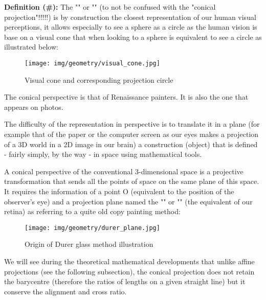	\textbf{Definition (\#\mydef):} The "" or "" (to not be confused with the "conical projection"!!!!!) is by construction the closest representation of our human visual perceptions, it allows especially to see a sphere as a circle as the human vision is base on a visual cone that when looking to a sphere is equivalent to see a circle as illustrated below:
	\begin{figure}[H]
		\centering
		\texttt{[image: img/geometry/visual\_cone.jpg]}
		\caption{Visual cone and corresponding projection circle}
	\end{figure}
	
	\begin{tcolorbox}[title=Remark,colframe=black,arc=10pt]
	The conical perspective is that of Renaissance painters. It is also the one that appears on photos.
	\end{tcolorbox}
	The difficulty of the representation in perspective is to translate it in a plane (for example that of the paper or the computer screen as our eyes makes a projection of a 3D world in a 2D image in our brain) a construction (object) that is defined - fairly simply, by the way - in space using mathematical tools.
	
	A conical perspective of the conventional $3$-dimensional space is a projective transformation that sends all the points of space on the same plane of this space. It requires the information of a point O (equivalent to the position of the observer's eye) and a projection plane named the "" or "" (the equivalent of our retina) as referring to a quite old copy painting method:
	\begin{figure}[H]
		\centering
		\texttt{[image: img/geometry/durer\_plane.jpg]}
		\caption{Origin of Durer glass method illustration}
	\end{figure}
	We will see during the theoretical mathematical developments that unlike affine projections (see the following subsection), the conical projection does not retain the barycentre (therefore the ratios of lengths on a given straight line) but it conserve the alignment and cross ratio.
	
